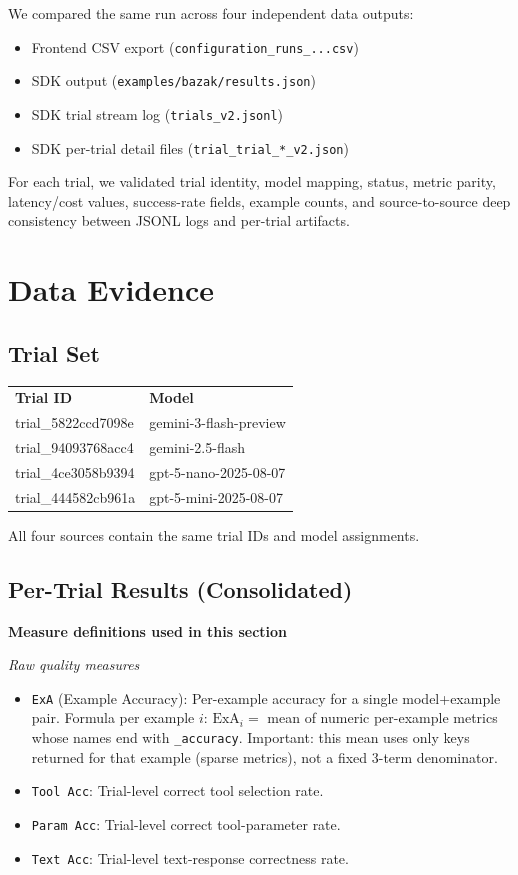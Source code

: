 \documentclass[11pt]{article}
\begin{document}
We compared the same run across four independent data outputs:
\begin{itemize}
    \item Frontend CSV export (\texttt{configuration\_runs\_...csv})
    \item SDK output (\texttt{examples/bazak/results.json})
    \item SDK trial stream log (\texttt{trials\_v2.jsonl})
    \item SDK per-trial detail files (\texttt{trial\_trial\_*\_v2.json})
\end{itemize}

For each trial, we validated trial identity, model mapping, status, metric parity, latency/cost values, success-rate fields, example counts, and source-to-source deep consistency between JSONL logs and per-trial artifacts.

\section{Data Evidence}

\subsection{Trial Set}

\begin{tabularx}{\textwidth}{>{\ttfamily}lX}
\rowcolor{TableHeader}
\normalfont\bfseries Trial ID & \bfseries Model \\
trial\_5822ccd7098e & gemini-3-flash-preview \\
trial\_94093768acc4 & gemini-2.5-flash \\
trial\_4ce3058b9394 & gpt-5-nano-2025-08-07 \\
trial\_444582cb961a & gpt-5-mini-2025-08-07 \\
\end{tabularx}

All four sources contain the same trial IDs and model assignments.

\subsection{Per-Trial Results (Consolidated)}

\textbf{Measure definitions used in this section}

\textit{Raw quality measures}
\begin{itemize}
    \item \texttt{ExA} (Example Accuracy): Per-example accuracy for a single model+example pair.
    Formula per example \(i\): \(\mathrm{ExA}_i =\) mean of numeric per-example metrics whose names end with \texttt{\_accuracy}.
    Important: this mean uses only keys returned for that example (sparse metrics), not a fixed 3-term denominator.
    \item \texttt{Tool Acc}: Trial-level correct tool selection rate.
    \item \texttt{Param Acc}: Trial-level correct tool-parameter rate.
    \item \texttt{Text Acc}: Trial-level text-response correctness rate.
\end{itemize}
\end{document}
